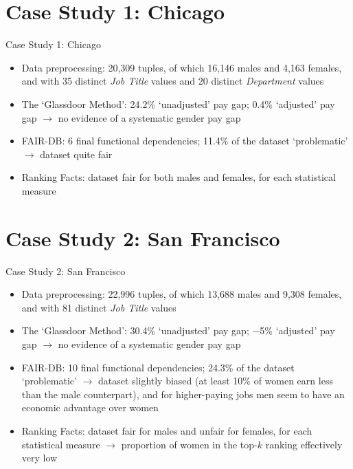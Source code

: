 \documentclass[usenames,dvipsnames]{beamer}
\begin{document}
    
    \section[]{Case Study 1: Chicago}
    \begin{frame}{Case Study 1: Chicago}
        \begin{itemize}
            \item \textcolor{defaultBlue}{Data preprocessing}: 20,309 tuples, of which 16,146 males and 4,163 females, and with 35 distinct \textit{Job Title} values and 20 distinct \textit{Department} values\newline
            \item \textcolor{defaultBlue}{The `Glassdoor Method'}: 24.2\% `unadjusted' pay gap; 0.4\% `adjusted' pay gap $\rightarrow$ no evidence of a systematic gender pay gap
            \item \textcolor{defaultBlue}{FAIR-DB}: 6 final functional dependencies; 11.4\% of the dataset `problematic' $\rightarrow$ dataset quite fair
            \item \textcolor{defaultBlue}{Ranking Facts}: dataset fair for both males and females, for each statistical measure
        \end{itemize}
    \end{frame}
    
    
    \section[]{Case Study 2: San Francisco}
    \begin{frame}{Case Study 2: San Francisco}
        \begin{itemize}
            \item \textcolor{defaultBlue}{Data preprocessing}: 22,996 tuples, of which 13,688 males and 9,308 females, and with 81 distinct \textit{Job Title} values\newline
            \item \textcolor{defaultBlue}{The `Glassdoor Method'}: 30.4\% `unadjusted' pay gap; \(-\)5\% `adjusted' pay gap $\rightarrow$ no evidence of a systematic gender pay gap
            \item \textcolor{defaultBlue}{FAIR-DB}: 10 final functional dependencies; 24.3\% of the dataset `problematic' $\rightarrow$ dataset slightly biased (at least 10\% of women earn less than the male counterpart), and for higher-paying jobs men seem to have an economic advantage over women
            \item \textcolor{defaultBlue}{Ranking Facts}: dataset fair for males and unfair for females, for each statistical measure $\rightarrow$ proportion of women in the top-\(k\) ranking effectively very low
        \end{itemize}
    \end{frame}
    
\end{document}
